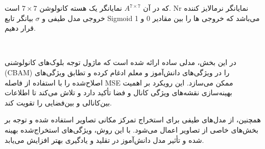 که در آن \( A^{7 \times 7} \) نمایانگر یک هسته کانولوشن \( 7 \times 7 \) است. Nr نمایانگر نرمالایز کننده خروجی مدل طیفی و $\sigma$ بیانگر تابع Sigmoid می‌باشد که خروجی ها را بین مقادیر 0 و 1 قرار دهیم.


‫‫


در این بخش، مدلی ساده ارائه شده است که ماژول توجه بلوک‌های کانولوشنی (CBAM) را در ویژگی‌های دانش‌آموز و معلم ادغام کرده و تطابق ویژگی‌های اصلاح‌شده را با استفاده از فاصله MSE ممکن می‌سازد. این رویکرد بر اهمیت بهینه‌سازی نقشه‌های ویژگی کانال و فضا تأکید دارد و تلاش می‌کند تا اطلاعات بین‌کانالی و بین‌فضایی را تقویت کند.

همچنین، از مدل‌های طیفی برای استخراج تمرکز مکانی تصاویر استفاده شده و توجه بر بخش‌های خاصی از تصاویر اعمال می‌شود. با این روش، ویژگی‌های استخراج‌شده بهینه شده و تأثیر مدل دانش‌آموز در تقلید و یادگیری بهتر افزایش می‌یابد.